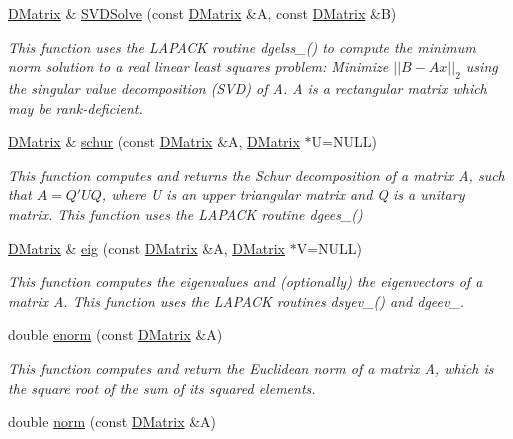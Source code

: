 \begin{DoxyCompactItemize}
\hyperlink{classDMatrix}{DMatrix} \& \hyperlink{classDMatrix_a13a156103ead07b546c81e6bdd366280}{SVDSolve} (const \hyperlink{classDMatrix}{DMatrix} \&A, const \hyperlink{classDMatrix}{DMatrix} \&B)
\begin{DoxyCompactList}\small\item\em This function uses the LAPACK routine dgelss\_\-() to compute the minimum norm solution to a real linear least squares problem: Minimize $ || B - A x ||_2 $ using the singular value decomposition (SVD) of A. A is a rectangular matrix which may be rank-\/deficient. \item\end{DoxyCompactList}\item 
\hyperlink{classDMatrix}{DMatrix} \& \hyperlink{classDMatrix_a2dfbc15150a97456fefdd9d23b1e0932}{schur} (const \hyperlink{classDMatrix}{DMatrix} \&A, \hyperlink{classDMatrix}{DMatrix} $\ast$U=NULL)
\begin{DoxyCompactList}\small\item\em This function computes and returns the Schur decomposition of a matrix A, such that $ A=Q'U Q $, where U is an upper triangular matrix and Q is a unitary matrix. This function uses the LAPACK routine dgees\_\-() \item\end{DoxyCompactList}\item 
\hyperlink{classDMatrix}{DMatrix} \& \hyperlink{classDMatrix_a160797dd45b601c20b26ad4c189fe8f2}{eig} (const \hyperlink{classDMatrix}{DMatrix} \&A, \hyperlink{classDMatrix}{DMatrix} $\ast$V=NULL)
\begin{DoxyCompactList}\small\item\em This function computes the eigenvalues and (optionally) the eigenvectors of a matrix A. This function uses the LAPACK routines dsyev\_\-() and dgeev\_\-. \item\end{DoxyCompactList}\item 
double \hyperlink{classDMatrix_aafa519c3dd4bd2b69731ef2fef01a371}{enorm} (const \hyperlink{classDMatrix}{DMatrix} \&A)
\begin{DoxyCompactList}\small\item\em This function computes and return the Euclidean norm of a matrix A, which is the square root of the sum of its squared elements. \item\end{DoxyCompactList}\item 
double \hyperlink{classDMatrix_a5169a4190b500841d156828863e414c8}{norm} (const \hyperlink{classDMatrix}{DMatrix} \&A)

\end{DoxyCompactItemize}
